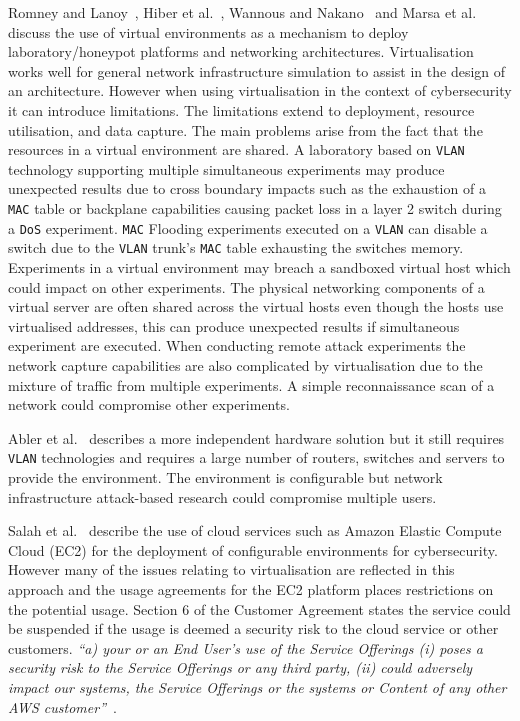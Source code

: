 \documentclass{ieeeaccess}
\begin{document}
Romney and Lanoy~\cite{LR:06}, Hiber et al.~\cite{HRS:08}, Wannous and
Nakano~\cite{WN:10} and Marsa et al.~\cite{MGDL:13} discuss the use of virtual
environments as a mechanism to deploy laboratory/honeypot platforms and
networking architectures. Virtualisation works well for general network
infrastructure simulation to assist in the design of an architecture. However
when using virtualisation in the context of cybersecurity it can introduce
limitations. The limitations extend to deployment, resource utilisation, and
data capture. The main problems arise from the fact that the resources in a
virtual environment are shared. A laboratory based on \texttt{VLAN} technology
supporting multiple simultaneous experiments may produce unexpected results due
to cross boundary impacts such as the exhaustion of a \texttt{MAC} table or
backplane capabilities causing packet loss in a layer 2 switch during a
\texttt{DoS} experiment. \texttt{MAC} Flooding experiments executed on a
\texttt{VLAN} can disable a switch due to the \texttt{VLAN} trunk's
\texttt{MAC} table exhausting the switches memory. Experiments in a virtual
environment may breach a sandboxed virtual host which could impact on other
experiments. The physical networking components of a virtual server are often
shared across the virtual hosts even though the hosts use virtualised
addresses, this can produce unexpected results if simultaneous experiment are
executed. When conducting remote attack experiments the network capture
capabilities are also complicated by virtualisation due to the mixture of
traffic from multiple experiments. A simple reconnaissance scan of a network
could compromise other experiments.

Abler et al.~\cite{ACG:06} describes a more independent hardware solution but
it still requires \texttt{VLAN} technologies and requires a large number of
routers, switches and servers to provide the environment. The environment is
configurable but network infrastructure attack-based research could compromise
multiple users.

Salah et al.~\cite{SHZ:15} describe the use of cloud services such as Amazon
Elastic Compute Cloud (EC2) for the deployment of configurable environments for
cybersecurity. However many of the issues relating to virtualisation are
reflected in this approach and the usage agreements for the EC2 platform places
restrictions on the potential usage. Section 6 of the Customer Agreement states
the service could be suspended if the usage is deemed a security risk to the
cloud service or other customers. \textit{``a) your or an End User's use of the
Service Offerings (i) poses a security risk to the Service Offerings or any
third party, (ii) could adversely impact our systems, the Service Offerings or
the systems or Content of any other AWS customer''}~\cite{AWS:18}.
\end{document}
